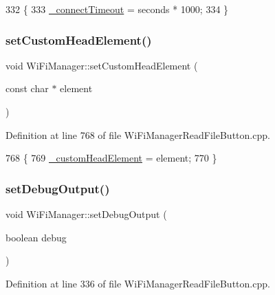 \begin{DoxyCode}
332                                                          \{
333   \hyperlink{class_wi_fi_manager_a6c03ca5d418b4d46e9a6d751a902184c}{\_connectTimeout} = seconds * 1000;
334 \}
\end{DoxyCode}
\mbox{\label{class_wi_fi_manager_a85570bcfe03da48c4be75b8e4302c4db}} 
\subsubsection{\texorpdfstring{set\+Custom\+Head\+Element()}{setCustomHeadElement()}}
{\footnotesize\ttfamily void Wi\+Fi\+Manager\+::set\+Custom\+Head\+Element (\begin{DoxyParamCaption}\item[{const char $\ast$}]{element }\end{DoxyParamCaption})}



Definition at line 768 of file Wi\+Fi\+Manager\+Read\+File\+Button.\+cpp.


\begin{DoxyCode}
768                                                           \{
769   \hyperlink{class_wi_fi_manager_a8860012564a62209d750c50e56319192}{\_customHeadElement} = element;
770 \}
\end{DoxyCode}
\mbox{\label{class_wi_fi_manager_a70d7f17596b9f10c3e4770702ac991c5}} 
\subsubsection{\texorpdfstring{set\+Debug\+Output()}{setDebugOutput()}}
{\footnotesize\ttfamily void Wi\+Fi\+Manager\+::set\+Debug\+Output (\begin{DoxyParamCaption}\item[{boolean}]{debug }\end{DoxyParamCaption})}



Definition at line 336 of file Wi\+Fi\+Manager\+Read\+File\+Button.\+cpp.


